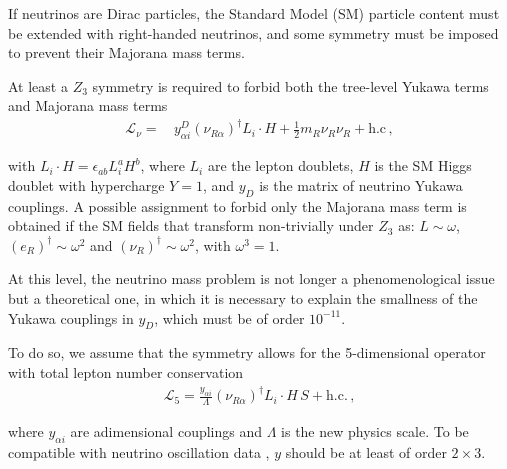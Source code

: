 If neutrinos are Dirac particles, the Standard Model (SM) particle content must be extended with right-handed neutrinos, and some symmetry must be imposed to prevent their Majorana mass terms.
\begin{frame}
At least a $Z_3$ symmetry is required to forbid both the tree-level Yukawa terms  and Majorana mass terms
\begin{align}
  \label{eq:tld}
  \mathcal{L}_{\nu}=&\,y^D_{\alpha i}\left( \nu_{R\alpha} \right)^{\dagger} L_i\cdot H +\frac{1}{2}m_R \nu_R \nu_R+\text{h.c}\,,
\end{align}
\end{frame}
with $L_i\cdot H=\epsilon_{ab}L^a_i H^b$, where $L_i$ are the lepton doublets, $H$ is the
SM Higgs doublet with hypercharge $Y=1$, and $y_D$ is the matrix of neutrino Yukawa couplings.  
A possible assignment to forbid only the Majorana mass term is obtained if the SM fields that transform
non-trivially under $Z_3$ as: $L\sim \omega$,
$\left( e_R \right)^{\dagger} \sim \omega^2$ and
$\left( \nu_R \right)^{\dagger} \sim \omega^2$, with $\omega^3=1$.
\begin{frame}
At this level, the neutrino mass problem is not longer a
phenomenological issue but a theoretical one, in which it is necessary
to explain the smallness of the Yukawa couplings in $y_D$, which must be  of order
$10^{-11}$.

To do so, we assume that the symmetry allows for the 5-dimensional operator with total lepton number conservation~\cite{Gu:2006dc}
\begin{align}
  \label{eq:blop}
  \mathcal{L}_5=
  \frac{y_{\alpha i}}{\Lambda} \left( \nu_{R\alpha} \right)^\dagger  L_i\cdot H\, S + 
\text{h.c.}\,,
\end{align}
\end{frame}
where $y_{\alpha i}$ are adimensional couplings and $\Lambda$ is the new physics scale.
To be compatible with  neutrino
oscillation data \cite{deSalas:2017kay}, $y$ should be at least of order $2\times 3$.  




